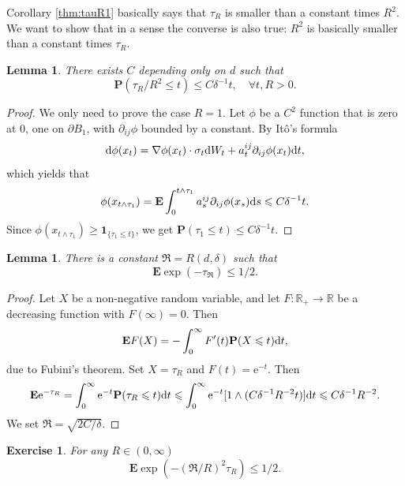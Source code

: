\documentclass[twoside, 12pt]{book}
\numberwithin{equation}{chapter}
\newtheorem{lemma}[theorem]{Lemma}
\newtheorem{exercise}{Exercise}[section]
\def\mR{{\mathbb R}}
\def\bE{{\mathbf E}}
\def\bP{{\mathbf P}}
\def\geq{\geqslant}
\def\leq{\leqslant}
\def\1{{\mathbf{1}}}
\def\p{\partial}
\def\d{\text{\rm{d}}}
\def\e{\mathrm{e}}
\begin{document}
	Corollary \ref{thm:tauR1} basically says that $\tau_R$ is smaller than a constant times $R^2$.  We want to show
	that in a sense the converse is also true: $R^2$ is basically smaller than a constant times $\tau_R$. 
	
	\begin{lemma}
		There exists $C$ depending only on $d$ such that 
		\begin{equation}\label{eq:stop-lower1}
			\bP(\tau_R/R^2\leq t) \leq C\delta^{-1} t, \quad \forall t, R>0. 
		\end{equation}
	\end{lemma}
	\begin{proof}
		We only need to prove the case $R=1$. Let $\phi$ be a $C^2$ function that is zero at $0$, one on $\partial B_1$, with $\partial_{i j} \phi$ bounded by a constant.  By It\^o's formula 
		\[
		\d \phi(x_t) = \nabla \phi(x_t) \cdot \sigma_t \d W_t + a_t^{ij} \p_{ij} \phi(x_t) \d t, 
		\]
		which yields that 
		\[
		\phi(x_{t\wedge \tau_1}) = \bE \int_0^{t\wedge \tau_1} a_{s}^{ij} \p_{ij}\phi(x_s) \d s\leq C \delta^{-1} t. 
		\]
		Since $\phi(x_{t\wedge \tau_1}) \geq \1_{\{\tau_1\leq t\}}$, we get $\bP(\tau_1\leq t)\leq C\delta^{-1} t$. 
	\end{proof}
	
	\begin{lemma}
		There is a constant $\mathfrak{R}=R(d,\delta)$ such that 
		$$
		\bE \exp(-{\tau_{\mathfrak{R}}}) \leq 1/2. 
		$$
	\end{lemma}
	\begin{proof}
		Let $X$ be a non-negative random variable, and let $F:\mR_+\to \mR$ be a decreasing  function with $F(\infty)=0$. Then 
		\begin{equation*}
			\bE F(X) = -\int_0^\infty F'(t) \bP (X\leq t) \d t, 
		\end{equation*}
		due to Fubini's theorem. Set $X=\tau_{R}$ and $F(t)=\e^{-t}$. Then 
		\begin{equation*}
			\bE \e^{-\tau_{R}}=\int_0^\infty \e^{-t} \bP (\tau_R\leq t) \d t \leq \int_0^\infty \e^{-t} [1\wedge (C\delta^{-1}R^{-2}t)] \d t \leq C \delta^{-1} R^{-2}. 
		\end{equation*}
		We set $\mathfrak{R}=\sqrt{2C/\delta}$. 
	\end{proof}
	
	\begin{exercise}
		For any $R \in(0, \infty)$
		\begin{equation}\label{eq:exp-stop2}
			\bE \exp \left(-\left(\mathfrak{R}/ R\right)^2 \tau_R\right) \leq 1 / 2 .
		\end{equation}
	\end{exercise}
	
\end{document}
